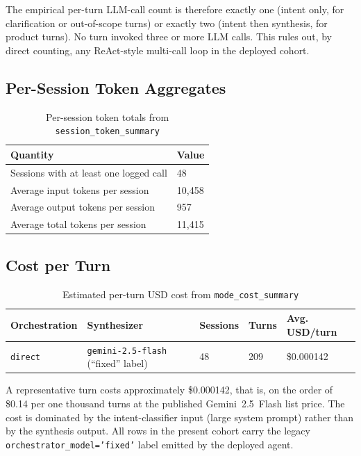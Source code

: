 The empirical per-turn LLM-call count is therefore exactly one (intent only, for clarification or out-of-scope turns) or exactly two (intent then synthesis, for product turns). No turn invoked three or more LLM calls. This rules out, by direct counting, any ReAct-style multi-call loop in the deployed cohort.

\subsection{Per-Session Token Aggregates}
\label{subsec:token_aggregates}

\begin{table}[H]
\centering
\begin{tabular}{p{6cm}p{4cm}}
\toprule
\textbf{Quantity} & \textbf{Value}\\
\midrule
Sessions with at least one logged call & 48\\
Average input tokens per session & 10{,}458\\
Average output tokens per session & 957\\
Average total tokens per session & 11{,}415\\
\bottomrule
\end{tabular}
\caption{Per-session token totals from \texttt{session\_token\_summary}}
\label{tab:token_aggregates}
\end{table}

\subsection{Cost per Turn}
\label{subsec:cost_per_turn}

\begin{table}[H]
\centering
\begin{tabular}{p{3cm}p{3cm}p{2cm}p{2cm}p{3cm}}
\toprule
\textbf{Orchestration} & \textbf{Synthesizer} & \textbf{Sessions} & \textbf{Turns} & \textbf{Avg. USD/turn}\\
\midrule
\texttt{direct} & \texttt{gemini-2.5-flash} (``fixed'' label) & 48 & 209 & \$0.000142\\
\bottomrule
\end{tabular}
\caption{Estimated per-turn USD cost from \texttt{mode\_cost\_summary}}
\label{tab:cost_per_turn}
\end{table}

A representative turn costs approximately \$0.000142, that is, on the order of \$0.14 per one thousand turns at the published Gemini~2.5~Flash list price. The cost is dominated by the intent-classifier input (large system prompt) rather than by the synthesis output. All rows in the present cohort carry the legacy \texttt{orchestrator\_model='fixed'} label emitted by the deployed agent.



